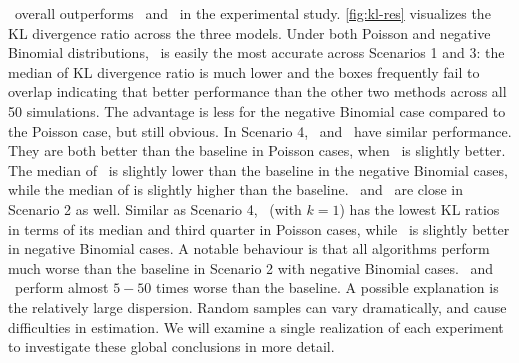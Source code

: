 \RtEstim\ overall outperforms \EpiEstim\ and \EpiLPS\ in the experimental study.
\autoref{fig:kl-res} visualizes the KL divergence ratio across the three models. Under
both Poisson and negative Binomial distributions, \RtEstim\ is easily the most
accurate across Scenarios 1 and 3: the median of KL divergence ratio is much lower
and the boxes frequently fail to overlap indicating that better performance than
the other two methods across all 50 simulations. 
The advantage is less for the
negative Binomial case compared to the Poisson case, but still obvious. 
In Scenario 4, \RtEstim\ and \EpiLPS\ 
have similar performance. They are both better than the baseline in Poisson cases, 
when \RtEstim\ is slightly better. The median of \EpiLPS\ is slightly lower
than the baseline in the negative Binomial cases, while the median of \RtEstim is slightly 
higher than the baseline. 
\EpiLPS\ and \RtEstim\ are close in Scenario 2 as well. Similar as Scenario 4, \RtEstim\ (with $k=1$)
has the lowest KL ratios in terms of its median and third quarter in Poisson cases, while 
\EpiLPS\ is slightly better in negative Binomial cases. 
A notable behaviour is that all algorithms 
perform much worse than the baseline in Scenario 2 with negative Binomial cases. 
\EpiLPS\ and \RtEstim\ perform almost $5-50$ times worse than the baseline. 
A possible explanation is the relatively large dispersion. Random samples can vary dramatically, 
and cause difficulties in estimation. 
We will examine a single
realization of each experiment to investigate these global conclusions in more
detail.

